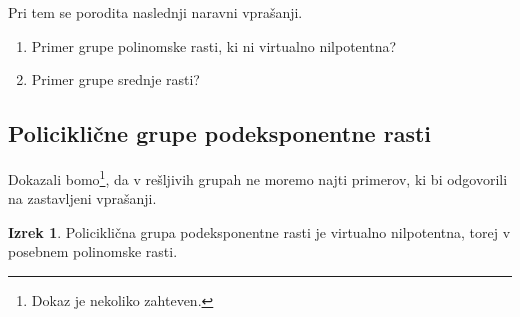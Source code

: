 \documentclass[11pt]{book}
\def\vprasanje{\color{oranzna}}
\theoremstyle{definition}
\theoremstyle{zgled}
\theoremstyle{odprtproblem}
\theoremstyle{domacanaloga}
\theoremstyle{izrek}
\newtheorem*{izrek}{Izrek}
\begin{document}
Pri tem se porodita naslednji naravni vprašanji.

\begin{enumerate}
    \item {\vprasanje {\sc (poli. in ne v. nilp.)} Primer grupe polinomske rasti, ki ni virtualno nilpotentna?}
    \item {\vprasanje {\sc (srednja)} Primer grupe srednje rasti?}
\end{enumerate}

\subsection{Policiklične grupe podeksponentne rasti}

Dokazali bomo\footnote{Dokaz je nekoliko zahteven.}, da v rešljivih grupah ne moremo najti primerov, ki bi odgovorili na zastavljeni vprašanji.



\begin{izrek}
Policiklična grupa podeksponentne rasti je virtualno nilpotentna, torej v posebnem polinomske rasti.
\end{izrek}
\end{document}
